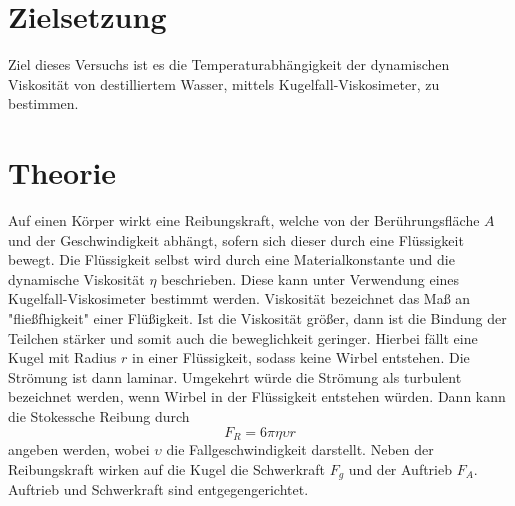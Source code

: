 \section{Zielsetzung}
Ziel dieses Versuchs ist es die Temperaturabhängigkeit der dynamischen Viskosität von destilliertem Wasser, mittels Kugelfall-Viskosimeter, zu bestimmen.
\section{Theorie}
\label{sec:Theorie}
Auf einen Körper wirkt eine Reibungskraft, welche von der Berührungsfläche $A$ und der Geschwindigkeit abhängt, sofern sich dieser durch eine Flüssigkeit bewegt.
Die Flüssigkeit selbst wird durch eine Materialkonstante und die dynamische Viskosität $\eta$ beschrieben.
Diese kann unter Verwendung eines Kugelfall-Viskosimeter bestimmt werden.
Viskosität bezeichnet das Maß an "fließfhigkeit" einer Flüßigkeit.
Ist die Viskosität größer, dann ist die Bindung der Teilchen stärker und somit auch die beweglichkeit geringer.
Hierbei fällt eine Kugel mit Radius $r$ in einer Flüssigkeit, sodass keine Wirbel entstehen.
Die Strömung ist dann laminar. Umgekehrt würde die Strömung als turbulent bezeichnet werden, wenn Wirbel in der Flüssigkeit entstehen würden.
Dann kann die Stokessche Reibung durch
\begin{equation}
  F_R = 6 \pi \eta \upsilon r
\end{equation}
angeben werden, wobei $\upsilon$ die Fallgeschwindigkeit darstellt.
Neben der Reibungskraft wirken auf die Kugel die Schwerkraft $F_g$ und der Auftrieb $F_A$.
Auftrieb und Schwerkraft sind entgegengerichtet.
